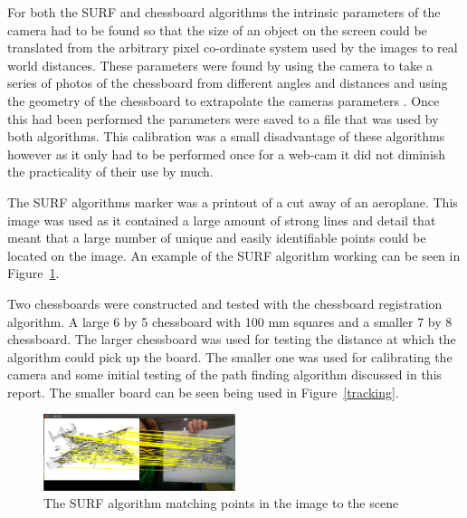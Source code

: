 For both the SURF and chessboard algorithms the intrinsic parameters of the camera had to be found so that the size of an object on the screen could be translated from the arbitrary pixel co-ordinate system used by the images to real world distances. These parameters were found by using the camera to take a series of photos of the chessboard from different angles and distances and using the geometry of the chessboard to extrapolate the cameras parameters \cite{cali}. Once this had been performed the parameters were saved to a file that was used by both algorithms. This calibration was a small disadvantage of these algorithms however as it only had to be performed once for a web-cam it did not diminish the practicality of their use by much.

The SURF algorithms marker was a printout of a cut away of an aeroplane. This image was used as it contained a large amount of strong lines and detail that meant that a large number of unique and easily identifiable points could be located on the image. An example of the SURF algorithm working can be seen in Figure~\ref{plane}. 

Two chessboards were constructed and tested with the chessboard registration algorithm. A large 6 by 5 chessboard with 100 mm squares and a smaller 7 by 8 chessboard. The larger chessboard was used for testing the distance at which the algorithm could pick up the board. The smaller one was used for calibrating the camera and some initial testing of the path finding algorithm discussed in this report. The smaller board can be seen being used in Figure~\ref{tracking}. 

\begin{figure}[ht]
	\begin{center}
		\includegraphics[width=0.5\textwidth]{surf_match}
	\end{center}
	\caption{The SURF algorithm matching points in the image to the scene}
	\label{plane}
\end{figure}